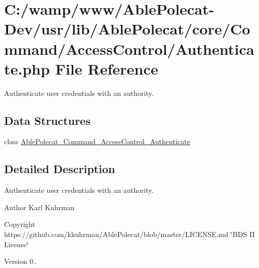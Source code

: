 \hypertarget{_command_2_access_control_2_authenticate_8php}{}\section{C\+:/wamp/www/\+Able\+Polecat-\/\+Dev/usr/lib/\+Able\+Polecat/core/\+Command/\+Access\+Control/\+Authenticate.php File Reference}
\label{_command_2_access_control_2_authenticate_8php}


Authenticate user credentials with an authority.  


\subsection*{Data Structures}
\begin{DoxyCompactItemize}
\item 
class \hyperlink{class_able_polecat___command___access_control___authenticate}{Able\+Polecat\+\_\+\+Command\+\_\+\+Access\+Control\+\_\+\+Authenticate}
\end{DoxyCompactItemize}


\subsection{Detailed Description}
Authenticate user credentials with an authority. 

\begin{DoxyAuthor}{Author}
Karl Kuhrman 
\end{DoxyAuthor}
\begin{DoxyCopyright}{Copyright}
https\+://github.com/kkuhrman/\+Able\+Polecat/blob/master/\+L\+I\+C\+E\+N\+S\+E.\+md \char`\"{}\+B\+D\+S I\+I License\char`\"{} 
\end{DoxyCopyright}
\begin{DoxyVersion}{Version}
0.. 
\end{DoxyVersion}
